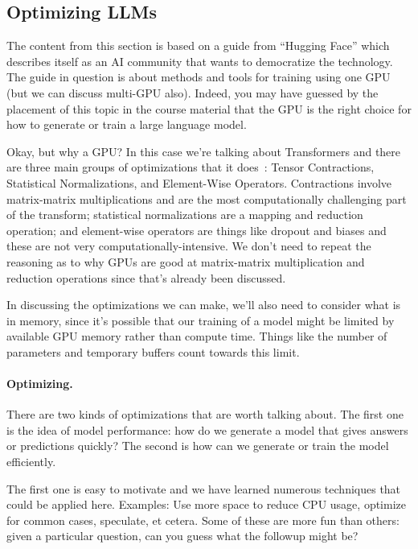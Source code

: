 \subsection*{Optimizing LLMs}
The content from this section is based on a guide from ``Hugging Face'' which describes itself as an AI community that wants to democratize the technology. The guide in question is about methods and tools for training using one GPU~\cite{hf} (but we can discuss multi-GPU also). Indeed, you may have guessed by the placement of this topic in the course material that the GPU is the right choice for how to generate or train a large language model. 

Okay, but why a GPU? In this case we're talking about Transformers and there are three main groups of optimizations that it does~\cite{hf2}: Tensor Contractions, Statistical Normalizations, and Element-Wise Operators. Contractions involve matrix-matrix multiplications and are the most computationally challenging part of the transform; statistical normalizations are a mapping and reduction operation; and element-wise operators are things like dropout and biases and these are not very computationally-intensive. We don't need to repeat the reasoning as to why GPUs are good at matrix-matrix multiplication and reduction operations since that's already been discussed. 

In discussing the optimizations we can make, we'll also need to consider what is in memory, since it's possible that our training of a model might be limited by available GPU memory rather than compute time. Things like the number of parameters and temporary buffers count towards this limit.

\paragraph{Optimizing.}There are two kinds of optimizations that are worth talking about. The first one is the idea of model performance: how do we generate a model that gives answers or predictions quickly? The second is how can we generate or train the model efficiently.

The first one is easy to motivate and we have learned numerous techniques that could be applied here. Examples: Use more space to reduce CPU usage, optimize for common cases, speculate, et cetera. Some of these are more fun than others: given a particular question, can you guess what the followup might be? 


